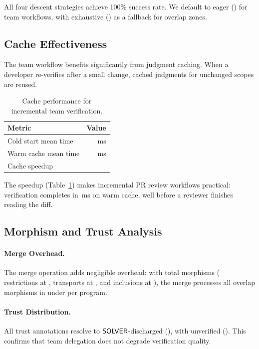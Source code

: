\documentclass[11pt]{article}
\begin{document}
All four descent strategies achieve 100\% success rate. We default to eager
(\subDescentEagerTime{}) for team workflows, with exhaustive
(\subDescentExhaustiveTime{}) as a fallback for overlap zones.

\subsection{Cache Effectiveness}

The team workflow benefits significantly from judgment caching.
When a developer re-verifies after a small change, cached judgments for
unchanged scopes are reused.

\begin{table}[t]
\centering
\caption{Cache performance for incremental team verification.}
\label{tab:cache}
\begin{tabular}{lr}
\toprule
\textbf{Metric} & \textbf{Value} \\
\midrule
Cold start mean time  & \suppColdMeanMs{}\,ms \\
Warm cache mean time  & \suppWarmMeanMs{}\,ms \\
Cache speedup         & \suppCacheSpeedup{} \\
\bottomrule
\end{tabular}
\end{table}

The \suppCacheSpeedup{} speedup (Table~\ref{tab:cache}) makes incremental
PR review workflows practical: verification completes in \suppWarmMeanMs{}\,ms
on warm cache, well before a reviewer finishes reading the diff.

\subsection{Morphism and Trust Analysis}

\paragraph{Merge Overhead.}
The merge operation adds negligible overhead: with \compMorphTotal{} total
morphisms (\compMorphRestriction{} restrictions at \compMorphRestrictionPct{},
\compMorphTransport{} transports at \compMorphTransportPct{}, and
\compMorphInclusion{} inclusions at \compMorphInclusionPct{}), the merge
processes all overlap morphisms in under \compTimeMean{} per program.

\paragraph{Trust Distribution.}
All \compTrustTotal{} trust annotations resolve to $\mathsf{SOLVER}$-discharged
(\compTrustSolverdischargedPct{}), with \compTrustUnverified{} unverified
(\compTrustUnverifiedPct{}). This confirms that team delegation does not
degrade verification quality.
\end{document}
